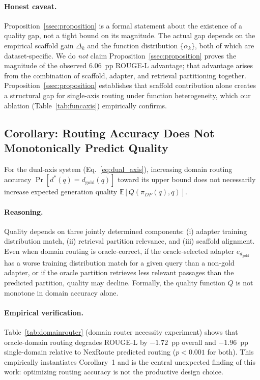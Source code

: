 \paragraph{Honest caveat.}
Proposition~\ref{ssec:proposition} is a formal statement about the existence of
a quality gap, not a tight bound on its magnitude. The actual gap depends on
the empirical scaffold gain $\Delta_k$ and the function distribution $\{\alpha_k\}$,
both of which are dataset-specific.
We do \emph{not} claim Proposition~\ref{ssec:proposition} proves the magnitude of
the observed 6.06~pp ROUGE-L advantage; that advantage arises from the combination
of scaffold, adapter, and retrieval partitioning together.
Proposition~\ref{ssec:proposition} establishes that scaffold contribution alone
creates a structural gap for single-axis routing under function heterogeneity,
which our ablation (Table~\ref{tab:funcaxis}) empirically confirms.

\subsection{Corollary: Routing Accuracy Does Not Monotonically Predict Quality}
\label{ssec:corollary}

\begin{tcolorbox}[colback=gray!5, colframe=gray!30, arc=2pt, boxrule=0.6pt,
  left=8pt, right=8pt, top=6pt, bottom=6pt, title={\textbf{Corollary 1}}]
For the dual-axis system (Eq.~\ref{eq:dual_axis}), increasing domain routing accuracy
$\Pr[d^*(q) = d_{\text{gold}}(q)]$ toward its upper bound does not necessarily
increase expected generation quality $\mathbb{E}[Q(\pi_{DF}(q), q)]$.
\end{tcolorbox}

\paragraph{Reasoning.}
Quality depends on three jointly determined components:
(i) adapter training distribution match, (ii) retrieval partition relevance, and
(iii) scaffold alignment. Even when domain routing is oracle-correct, if the
oracle-selected adapter $e_{d_{\text{gold}}}$ has a worse training distribution match
for a given query than a non-gold adapter, or if the oracle partition retrieves
less relevant passages than the predicted partition, quality may decline.
Formally, the quality function $Q$ is not monotone in domain accuracy alone.

\paragraph{Empirical verification.}
Table~\ref{tab:domainrouter} (domain router necessity experiment) shows that
oracle-domain routing degrades ROUGE-L by $-1.72$~pp overall and $-1.96$~pp
single-domain relative to NexRoute predicted routing ($p < 0.001$ for both).
This empirically instantiates Corollary~1 and is the central unexpected finding
of this work: optimizing routing accuracy is not the productive design choice.


